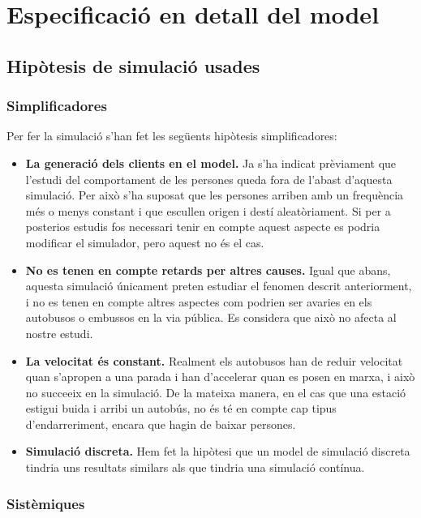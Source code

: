 \documentclass[a4paper,10pt]{article}
\begin{document}
\section{Especificació en detall del model}

\subsection{Hipòtesis de simulació usades}

\subsubsection{Simplificadores}

Per fer la simulació s'han fet les següents hipòtesis simplificadores:
\begin{itemize}
 \item \textbf{La generació dels clients en el model.} Ja s'ha indicat prèviament que l'estudi del comportament de les persones queda fora de l'abast d'aquesta simulació. Per això s'ha suposat que les persones arriben amb un frequència més o menys constant i que escullen origen i destí aleatòriament. Si per a posterios estudis fos necessari tenir en compte aquest aspecte es podria modificar el simulador, pero aquest no és el cas.
 \item \textbf{No es tenen en compte retards per altres causes.} Igual que abans, aquesta simulació únicament preten estudiar el fenomen descrit anteriorment, i no es tenen en compte altres aspectes com podrien ser avaries en els autobusos o embussos en la via pública. Es considera que això no afecta al nostre estudi.
 \item \textbf{La velocitat és constant.} Realment els autobusos han de reduir velocitat quan s'apropen a una parada i han d'accelerar quan es posen en marxa, i això no succeeix en la simulació. De la mateixa manera, en el cas que una estació estigui buida i arribi un autobús, no és té en compte cap tipus d'endarreriment, encara que hagin de baixar persones.
 \item \textbf{Simulació discreta.} Hem fet la hipòtesi que un model de simulació discreta tindria uns resultats similars als que tindria una simulació contínua.
\end{itemize}


\subsubsection{Sistèmiques}
\end{document}
